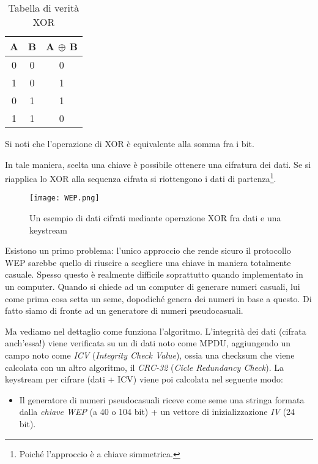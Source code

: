 \documentclass[14pt]{extreport}
\begin{document}
\begin{table}[H]
\centering
\begin{tabular}{@{}c|c|c@{}}
\toprule
\textbf{A} & \textbf{B} & \textbf{A $\oplus$ B} \\ \midrule
0          & 0          & 0           \\
1          & 0          & 1           \\
0          & 1          & 1           \\
1          & 1          & 0           \\ \bottomrule
\end{tabular}
\caption{Tabella di verità XOR}
\label{tab:XOR}
\end{table}

Si noti che l'operazione di XOR è equivalente alla somma fra i bit.

In tale maniera, scelta una chiave è possibile ottenere una cifratura dei dati. Se si riapplica lo XOR alla sequenza cifrata si riottengono i dati di partenza\footnote{Poiché l'approccio è a chiave simmetrica.}.


\begin{figure}[H]
    \centering
    \texttt{[image: WEP.png]}
    \caption{Un esempio di dati cifrati mediante operazione XOR fra dati e una keystream}
    \label{WEP1}
\end{figure}

Esistono un primo problema: l'unico approccio che rende sicuro il protocollo WEP sarebbe quello di riuscire a scegliere una chiave in maniera totalmente casuale. Spesso questo è realmente difficile soprattutto quando implementato in un computer. Quando si chiede ad un computer di generare numeri casuali, lui come prima cosa setta un seme, dopodiché genera dei numeri in base a questo. Di fatto siamo di fronte ad un generatore di numeri pseudocasuali.\newline


Ma vediamo nel dettaglio come funziona l'algoritmo.
L'integrità dei dati (cifrata anch'essa!) viene verificata su un  di dati noto come MPDU, aggiungendo un campo noto come \textit{ICV} (\textit{Integrity Check Value}), ossia una checksum che viene calcolata con un altro algoritmo, il \textit{CRC-32} (\textit{Cicle Redundancy Check}). La keystream per cifrare (dati + ICV) viene poi calcolata nel seguente modo:
    \begin{itemize}
        \item Il generatore di numeri pseudocasuali riceve come seme una stringa formata dalla \textit{chiave WEP} (a 40 o 104 bit) + un vettore di inizializzazione \textit{IV} (24 bit). 
    \end{itemize}
    
\end{document}
